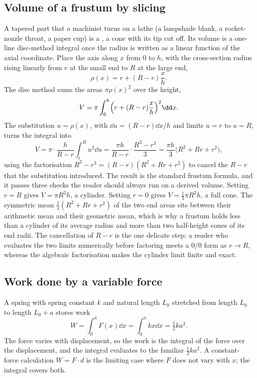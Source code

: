 

\subsection{Volume of a frustum by slicing}

A tapered part that a machinist turns on a lathe (a lampshade blank, a
rocket-nozzle throat, a paper cup) is a , a cone with its
tip cut off. Its volume is a one-line disc-method integral once the radius
is written as a linear function of the axial coordinate. Place the axis
along $x$ from $0$ to $h$, with the cross-section radius rising linearly
from $r$ at the small end to $R$ at the large end,
\[
\rho(x) = r + (R - r)\frac{x}{h}.
\]
The disc method sums the areas $\pi\rho(x)^{2}$ over the height,
\[
V = \pi\int_{0}^{h}\Bigl(r + (R - r)\frac{x}{h}\Bigr)^{2}\dd x.
\]
The substitution $u = \rho(x)$, with $\dd u = (R - r)\dd x/h$ and limits
$u = r$ to $u = R$, turns the integral into
\[
V = \pi\cdot\frac{h}{R - r}\int_{r}^{R} u^{2}\dd u =
\frac{\pi h}{R - r}\cdot\frac{R^{3} - r^{3}}{3} =
\frac{\pi h}{3}\bigl(R^{2} + Rr + r^{2}\bigr),
\]
using the factorisation $R^{3} - r^{3} = (R - r)(R^{2} + Rr + r^{2})$ to
cancel the $R - r$ that the substitution introduced. The result is the
standard frustum formula, and it passes three checks the reader should
always run on a derived volume. Setting $r = R$ gives $V = \pi R^{2}h$, a
cylinder. Setting $r = 0$ gives $V = \tfrac{1}{3}\pi R^{2}h$, a full cone.
The symmetric mean $\tfrac{1}{3}(R^{2} + Rr + r^{2})$ of the two end areas
sits between their arithmetic mean and their geometric mean, which is why
a frustum holds less than a cylinder of its average radius and more than
two half-height cones of its end radii. The cancellation of $R - r$ is the
one delicate step: a reader who evaluates the two limits numerically
before factoring meets a $0/0$ form as $r \to R$, whereas the algebraic
factorisation makes the cylinder limit finite and exact.

\subsection{Work done by a variable force}

A spring with spring constant $k$ and natural length $L_{0}$
stretched from length $L_{0}$ to length $L_{0} + a$ stores work
\[
W = \int_{0}^{a} F(x) \dd x = \int_{0}^{a} k x \dd x =
\tfrac{1}{2} k a^{2}.
\]
The force varies with displacement, so the work is the integral of
the force over the displacement, and the integral evaluates to the
familiar $\tfrac{1}{2} k a^{2}$. A constant-force calculation
$W = F \cdot d$ is the limiting case where $F$ does not vary with
$x$; the integral covers both.


